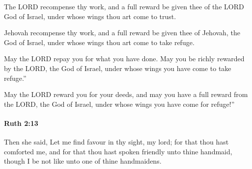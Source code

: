 			The LORD recompense thy work, and a full reward be given thee of the LORD God of Israel, under whose wings thou art come to trust.

			\begin{versebox}
					\item[BHS] 
					\item[LXX] 
					\item[ASV] Jehovah recompense thy work, and a full reward be given thee of Jehovah, the God of Israel, under whose wings thou art come to take refuge.
					\item[NIV] May the LORD repay you for what you have done. May you be richly rewarded by the LORD, the God of Israel, under whose wings you have come to take refuge.”
					\item[NRSV] May the LORD reward you for your deeds, and may you have a full reward from the LORD, the God of Israel, under whose wings you have come for refuge!”
			\end{versebox}

		\paragraph{Ruth 2:13} %
			\label{RUTH-2-13}

			Then she said, Let me find favour in thy sight, my lord; for that thou hast comforted me, and for that thou hast spoken friendly unto thine handmaid, though I be not like unto one of thine handmaidens.

